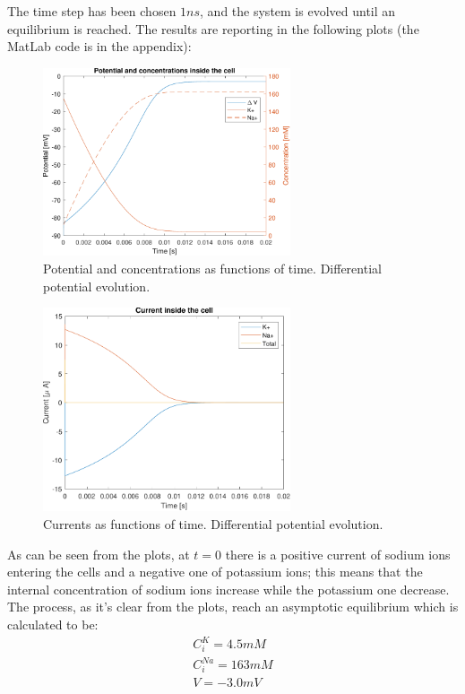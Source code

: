 \documentclass[11pt,a4 paper]{article}
\begin{document}
The time step has been chosen $1\si{ns}$, and the system is evolved until an equilibrium is reached. The results are reporting in the following plots (the MatLab code is in the appendix):

\begin{figure}[H]
    \centering
    \includegraphics[width=0.65\textwidth]{potential_diffpot.pdf}
    \caption{Potential and concentrations as functions of time. Differential potential evolution.}
    \label{fig:potential_diffpot}
\end{figure}

\begin{figure}[H]
    \centering
    \includegraphics[width=0.65\textwidth]{current_diffpot.pdf}
    \caption{Currents as functions of time. Differential potential evolution.}
    \label{fig:current_diffpot}
\end{figure}

As can be seen from the plots, at $t=0$ there is a positive current of sodium ions entering the cells and a negative one of potassium ions; this means that the internal concentration of sodium ions increase while the potassium one decrease. The process, as it's clear from the plots, reach an asymptotic equilibrium which is calculated to be:
\begin{gather*}
    C_i^K = 4.5 \si{mM}\\
    C_i^{Na} = 163 \si{mM}\\
    V = -3.0 \si{mV}
\end{gather*}
\end{document}
